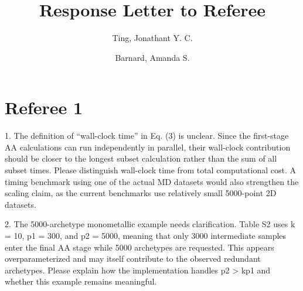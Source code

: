 \documentclass[11pt,a4paper]{article}
\begin{document}
\title{Response Letter to Referee}
\author{
  Ting, Jonathant Y. C.\\
  \and
  Barnard, Amanda S.\\
}
\maketitle

\def\correctionDone#1{{\color{blue}{#1}}}
\long{}



\section{Referee 1}

1. The definition of “wall-clock time” in Eq. (3) is unclear. Since the first-stage AA calculations can run independently in parallel, their wall-clock contribution should be closer to the longest subset calculation rather than the sum of all subset times. Please distinguish wall-clock time from total computational cost. A timing benchmark using one of the actual MD datasets would also strengthen the scaling claim, as the current benchmarks use relatively small 5000-point 2D datasets.


2. The 5000-archetype monometallic example needs clarification. Table S2 uses k = 10, p1 = 300, and p2 = 5000, meaning that only 3000 intermediate samples enter the final AA stage while 5000 archetypes are requested. This appears overparameterized and may itself contribute to the observed redundant archetypes. Please explain how the implementation handles p2 > kp1 and whether this example remains meaningful.
\end{document}
